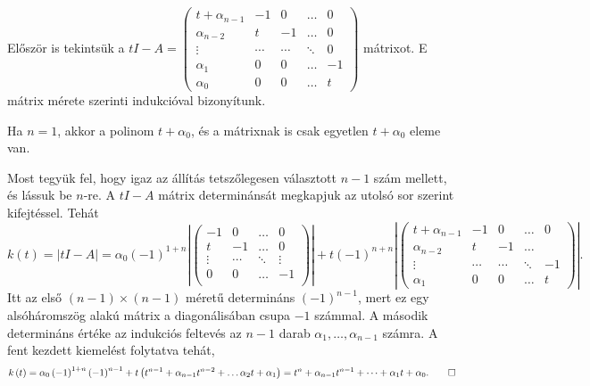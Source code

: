 \documentclass[9pt, a4paper, showtrims]{memoir}
\makeatletter
\renewenvironment{proof}[1][\proofname]
    {\par\pushQED{\qed}%
    \normalfont \topsep6\p@\@plus6\p@\relax
    \trivlist
    \item[\hskip\labelsep
        \itshape
    #1\@addpunct{:}]\ignorespaces}
    {\popQED\endtrivlist\@endpefalse}
\theoremstyle{plain}
\theoremstyle{remark}
\theoremstyle{definition}
\makeatother
\begin{document}
\begin{proof}
	Először is tekintsük a
	\(
	tI-A=
	\begin{pmatrix}
		t+\alpha_{n-1} & -1     & 0      & \dots  & 0  \\
		\alpha_{n-2}   & t      & -1     & \dots  & 0  \\
		\vdots         & \cdots & \cdots & \ddots & 0  \\
		\alpha_1       & 0      & 0      & \dots  & -1 \\
		\alpha_0       & 0      & 0      & \dots  & t
	\end{pmatrix}
	\) mátrixot.
	E mátrix mérete szerinti indukcióval bizonyítunk.

	Ha $n=1$, akkor a polinom $t+\alpha_0$, és a mátrixnak is csak egyetlen $t+\alpha_0$ eleme van.

	Most tegyük fel, hogy igaz az állítás tetszőlegesen választott $n-1$ szám mellett, és lássuk be $n$-re.
	A $tI-A$ mátrix determinánsát megkapjuk az utolsó sor szerint kifejtéssel.
	Tehát
	\[
		k\left( t \right)=
		|tI-A|=
		\alpha_0
		\left( -1 \right)^{1+n}
		\left|
		\begin{pmatrix}
			-1     & 0      & \dots  & 0      \\
			t      & -1     & \dots  & 0      \\
			\vdots & \cdots & \ddots & \vdots \\
			0      & 0      & \dots  & -1     \\
		\end{pmatrix}
		\right|
		+t\left( -1 \right)^{n+n}
		\left|
		\begin{pmatrix}
			t+\alpha_{n-1} & -1     & 0      & \dots  & 0       \\
			\alpha_{n-2}   & t      & -1     & \dots  &   \\
			\vdots         & \cdots & \cdots & \ddots & -1      \\
			\alpha_1       & 0      & 0      & \dots  & t
		\end{pmatrix}
		\right|.
	\]
	Itt az első $\left( n-1 \right)\times \left( n-1 \right)$ méretű determináns $\left( -1 \right)^{n-1}$,
	mert ez egy alsóháromszög alakú mátrix a diagonálisában csupa $-1$ számmal.
	A második determináns értéke az indukciós feltevés az $n-1$ darab
	$ \alpha_1,\ldots, \alpha_{n-1}$ számra.
	A fent kezdett kiemelést folytatva tehát,
	\[
		k\left( t \right)
		=
		\alpha_0
		\left( -1 \right)^{1+n}\left( -1 \right)^{n-1}
		+t\left(
		t^{n-1}+\alpha_{n-1}t^{n-2}+\dots\alpha_2t+\alpha_1
		\right)
		=
		t^n+\alpha_{n-1}t^{n-1}+\dots+\alpha_1t+\alpha_0.\qedhere
	\]
\end{proof}
\end{document}
